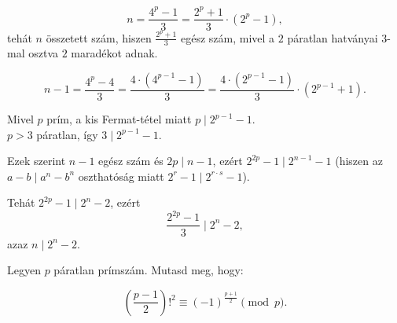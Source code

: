 \begin{solution}
	\[
	n=\frac{4^{p}-1}{3}=\frac{2^{p}+1}{3}\cdot(2^{p}-1),
	\]
	tehát $n$ összetett szám, hiszen $\frac{2^{p}+1}{3}$ egész szám,
	mivel a $2$ páratlan hatványai $3$-mal osztva $2$ maradékot adnak.
	
	\[
	n-1=\frac{4^{p}-4}{3}=\frac{4\cdot(4^{p-1}-1)}{3}=\frac{4\cdot(2^{p-1}-1)}{3}\cdot(2^{p-1}+1).
	\]
	
	Mivel $p$ prím, a kis Fermat-tétel miatt $p\mid2^{p-1}-1$.\\
	
	$p>3$ páratlan, így $3\mid2^{p-1}-1$.
	
	Ezek szerint $n-1$ egész szám és $2p\mid n-1$, ezért $2^{2p}-1\mid2^{n-1}-1$
	(hiszen az $a-b\mid a^{n}-b^{n}$ oszthatóság miatt $2^{r}-1\mid2^{r\cdot s}-1$).
	
	Tehát $2^{2p}-1\mid2^{n}-2$, ezért 
	\[
	\frac{2^{2p}-1}{3}\mid2^{n}-2,
	\]
	azaz $n\mid2^{n}-2.$
\end{solution}
\begin{extraproblem}
	Legyen $p$ páratlan prímszám. Mutasd meg, hogy:
	
	\[
	\left(\frac{p-1}{2}\right)!^{2}\equiv(-1)^{\frac{p+1}{2}}\pmod p.
	\]
\end{extraproblem}

